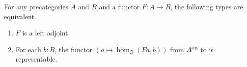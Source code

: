 \documentclass[hott-all.tex]{subfiles}
\begin{document}
\begin{lem}\label{ct:adj-repr}
  For any precategories $A$ and $B$ and a functor $F:A\to B$, the following types are equivalent.
  \begin{enumerate}
  \item $F$ is a left adjoint.\label{item:ct:ar1}
  \item For each $b:B$, the functor $(a \mapsto \hom_B(Fa,b))$ from $A^{\mathrm{op}}$ to \uset is representable.\label{item:ct:ar2}
  \end{enumerate}
\end{lem}
%
%
%
\end{document}
